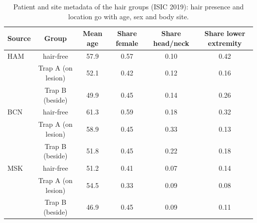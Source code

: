 \begin{table}[H]\centering\scriptsize
\caption{Patient and site metadata of the hair groups (ISIC 2019): hair presence and location go with age, sex and body site.}\label{tab:hairmeta}
\begin{tabular}{lccccc}\toprule
Source & Group & Mean age & Share female & Share head/neck & Share lower extremity \\\midrule
HAM & hair-free & 57.9 & 0.57 & 0.10 & 0.42 \\
 & Trap A (on lesion) & 52.1 & 0.42 & 0.12 & 0.16 \\
 & Trap B (beside) & 49.9 & 0.45 & 0.14 & 0.26 \\
BCN & hair-free & 61.3 & 0.59 & 0.18 & 0.32 \\
 & Trap A (on lesion) & 58.9 & 0.45 & 0.33 & 0.13 \\
 & Trap B (beside) & 51.8 & 0.45 & 0.22 & 0.18 \\
MSK & hair-free & 51.2 & 0.41 & 0.07 & 0.14 \\
 & Trap A (on lesion) & 54.5 & 0.33 & 0.09 & 0.08 \\
 & Trap B (beside) & 46.9 & 0.45 & 0.09 & 0.11 \\
\bottomrule\end{tabular}
\end{table}
